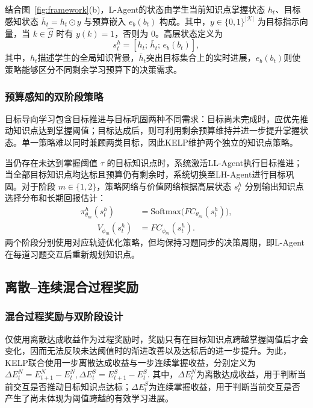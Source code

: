 \documentclass[UTF8,a4paper,zihao=5,twocolumn]{ctexart}
\begin{document}
结合图~\ref{fig:framework}(b)，L-Agent的状态由学生当前知识点掌握状态 $h_t$、目标感知状态 $\bar{h}_t=h_t\odot y$ 与预算嵌入 $e_b(b_t)$ 构成。其中，$y\in\{0,1\}^{|\mathcal{K}|}$ 为目标指示向量，当 $k\in\hat{\mathcal{G}}$ 时有 $y(k)=1$，否则为 $0$。高层状态定义为
\begin{equation}
s_t^h=[h_t;\,\bar{h}_t;\,e_b(b_t)],
\end{equation}
其中，$h_t$描述学生的全局知识背景，$\bar{h}_t$突出目标集合上的实时进展，$e_b(b_t)$则使策略能够区分不同剩余学习预算下的决策需求。

\subsubsection{预算感知的双阶段策略}

目标导向学习包含目标推进与目标巩固两种不同需求：目标尚未完成时，应优先推动知识点达到掌握阈值；目标达成后，则可利用剩余预算维持并进一步提升掌握状态。单一策略难以同时兼顾两类目标，因此KELP维护两个独立的知识点策略。

当仍存在未达到掌握阈值 $\tau$ 的目标知识点时，系统激活LL-Agent执行目标推进；当全部目标知识点均达标且预算仍有剩余时，系统切换至LH-Agent进行目标巩固。对于阶段 $m\in\{1,2\}$，策略网络与价值网络根据高层状态 $s_t^h$ 分别输出知识点选择分布和长期回报估计：
\begin{equation}
\begin{aligned}
\pi_{\theta_m}^h( s_t^h)
&=
\mathrm{Softmax}\!\big(FC_{\theta_m}(s_t^h)\big),\\
\qquad
V_{\phi_m}(s_t^h)&=FC_{\phi_m}(s_t^h).
\end{aligned}
\end{equation}
两个阶段分别使用对应轨迹优化策略，但均保持习题同步的决策周期，即L-Agent在每道习题交互后重新规划知识点。

\subsection{离散--连续混合过程奖励}

\subsubsection{混合过程奖励与双阶段设计}

仅使用离散达成收益作为过程奖励时，奖励只有在目标知识点跨越掌握阈值后才会变化，因而无法反映未达阈值时的渐进改善以及达标后的进一步提升。为此，KELP联合使用一步离散达成收益与一步连续掌握收益，分别定义为
$
\Delta E_t^{N}=E_{t+1}^{N}-E_t^{N},
\Delta E_t^{S}=E_{t+1}^{S}-E_t^{S}.
$
其中，$\Delta E_t^{N}$为离散达成收益，用于判断当前交互是否推动目标知识点达标；$\Delta E_t^{S}$为连续掌握收益，用于判断当前交互是否产生了尚未体现为阈值跨越的有效学习进展。
\end{document}
